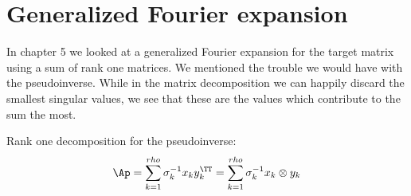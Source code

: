 \section{Generalized Fourier expansion}
In chapter 5 we looked at a generalized Fourier expansion for the target matrix using a sum of rank one matrices. We mentioned the trouble we would have with the pseudoinverse. While in the matrix decomposition we can happily discard the smallest singular values, we see that these are the values which contribute to the sum the most.

Rank one decomposition for the pseudoinverse:
\begin{equation}
  \Ap = \sum_{k=1}^{rho} {\sigma_{k}^{-1}x_{k}y_{k}^{\TT}}  = \sum_{k=1}^{rho} {\sigma_{k}^{-1}x_{k}\otimes y_{k}}
\end{equation}

\endinput